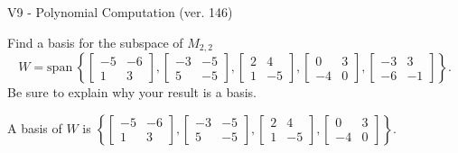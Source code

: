 \begin{exercise}
  \begin{exerciseTitle}V9 - Polynomial Computation (ver. 146)\end{exerciseTitle}
  \begin{exerciseStatement}
    Find a basis for the subspace of \(M_{2,2}\) 
\[W=\mathrm{span}\ \left\{\left[\begin{array}{cc}
-5 & -6 \\
1 & 3
\end{array}\right] , \left[\begin{array}{cc}
-3 & -5 \\
5 & -5
\end{array}\right] , \left[\begin{array}{cc}
2 & 4 \\
1 & -5
\end{array}\right] , \left[\begin{array}{cc}
0 & 3 \\
-4 & 0
\end{array}\right] , \left[\begin{array}{cc}
-3 & 3 \\
-6 & -1
\end{array}\right]\right\}.\]
 Be sure to explain why your result is a basis.


  \end{exerciseStatement}
  \begin{exerciseAnswer}
   A basis of \(W\) is  \(\left\{\left[\begin{array}{cc}
-5 & -6 \\
1 & 3
\end{array}\right] , \left[\begin{array}{cc}
-3 & -5 \\
5 & -5
\end{array}\right] , \left[\begin{array}{cc}
2 & 4 \\
1 & -5
\end{array}\right] , \left[\begin{array}{cc}
0 & 3 \\
-4 & 0
\end{array}\right]\right\}\).
  


  \end{exerciseAnswer}
\end{exercise}